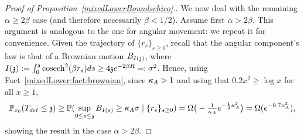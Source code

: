 \begin{proof}[Proof of Proposition~\ref{mixedLowerBoundschico}.]
 We now deal with the remaining $\alpha \ge 2\beta$ case (and therefore necessarily $\beta < 1/2$). Assume first $\alpha > 2\beta$. This argument is analogous to the one for angular movement: we repeat it for convenience. 
Given the trajectory of $\{r_{s}\}_{s\geq 0}$, recall that the angular component's law is that of a Brownian motion $B_{I(\mathfrak{z})}$, where $I(\mathfrak{z}):=\int_0^{\mathfrak{z}} \operatorname{cosech}^2(\beta r_s)ds \ge 4\mathfrak{z} e^{-2\beta R} =: \sigma^2$.
Hence, using Fact~\ref{mixedLower:fact:brownian}, since $\kappa_A > 1$ and using that $0.2x^2\ge \log x$ for all $x\ge 1$,
$$
\mathbb{P}_{x_0}(T_{det}\leq\mathfrak{z})\geq \mathbb{P}(\sup_{0\leq s\leq \mathfrak{z}} B_{I(s)}\geq \kappa_A \sigma \mid \{r_s\}_{s\geq 0}) =\Omega\big(-\tfrac{1}{\kappa_A}e^{-\frac12\kappa_A^2}\big)={\Omega(e^{-0.7\kappa_A^2})}, 
$$
showing the result in the case $\alpha > 2\beta$.



\end{proof}
